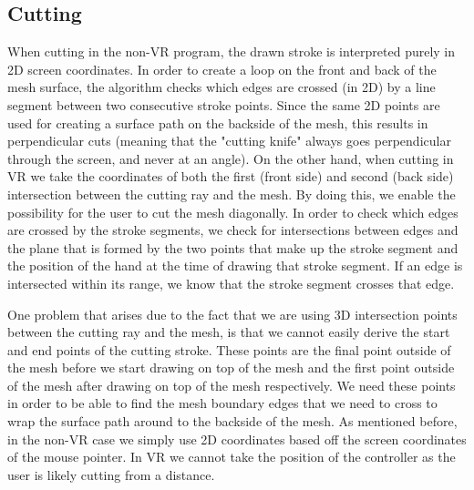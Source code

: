 \subsection{Cutting}
When cutting in the non-VR program, the drawn stroke is interpreted purely in 2D screen coordinates. In order to create a loop on the front and back of the mesh surface, the algorithm checks which edges are crossed (in 2D) by a line segment between two consecutive stroke points. Since the same 2D points are used for creating a surface path on the backside of the mesh, this results in perpendicular cuts (meaning that the "cutting knife" always goes perpendicular through the screen, and never at an angle). On the other hand, when cutting in VR we take the coordinates of both the first (front side) and second (back side) intersection between the cutting ray and the mesh. By doing this, we enable the possibility for the user to cut the mesh diagonally. In order to check which edges are crossed by the stroke segments, we check for intersections between edges and the plane that is formed by the two points that make up the stroke segment and the position of the hand at the time of drawing that stroke segment. If an edge is intersected within its range, we know that the stroke segment crosses that edge. 

One problem that arises due to the fact that we are using 3D intersection points between the cutting ray and the mesh, is that we cannot easily derive the start and end points of the cutting stroke. These points are the final point outside of the mesh before we start drawing on top of the mesh and the first point outside of the mesh after drawing on top of the mesh respectively. We need these points in order to be able to find the mesh boundary edges that we need to cross to wrap the surface path around to the backside of the mesh. As mentioned before, in the non-VR case we simply use 2D coordinates based off the screen coordinates of the mouse pointer. In VR we cannot take the position of the controller as the user is likely cutting from a distance. 


